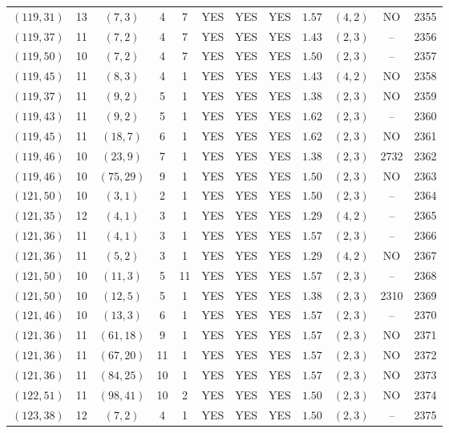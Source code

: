 \begin{longtable}{|c|c|c|c|c|c|c|c|c|c|c|c|}
$(119,31)$ & 13 & $(7,3)$ & 4 & 7 & YES & YES & YES & $1.57$ & $(4,2)$ & NO & 2355\\
$(119,37)$ & 11 & $(7,2)$ & 4 & 7 & YES & YES & YES & $1.43$ & $(2,3)$ & -- & 2356\\
$(119,50)$ & 10 & $(7,2)$ & 4 & 7 & YES & YES & YES & $1.50$ & $(2,3)$ & -- & 2357\\
$(119,45)$ & 11 & $(8,3)$ & 4 & 1 & YES & YES & YES & $1.43$ & $(4,2)$ & NO & 2358\\
$(119,37)$ & 11 & $(9,2)$ & 5 & 1 & YES & YES & YES & $1.38$ & $(2,3)$ & NO & 2359\\
$(119,43)$ & 11 & $(9,2)$ & 5 & 1 & YES & YES & YES & $1.62$ & $(2,3)$ & -- & 2360\\
$(119,45)$ & 11 & $(18,7)$ & 6 & 1 & YES & YES & YES & $1.62$ & $(2,3)$ & NO & 2361\\
$(119,46)$ & 10 & $(23,9)$ & 7 & 1 & YES & YES & YES & $1.38$ & $(2,3)$ & 2732 & 2362\\
$(119,46)$ & 10 & $(75,29)$ & 9 & 1 & YES & YES & YES & $1.50$ & $(2,3)$ & NO & 2363\\
$(121,50)$ & 10 & $(3,1)$ & 2 & 1 & YES & YES & YES & $1.50$ & $(2,3)$ & -- & 2364\\
$(121,35)$ & 12 & $(4,1)$ & 3 & 1 & YES & YES & YES & $1.29$ & $(4,2)$ & -- & 2365\\
$(121,36)$ & 11 & $(4,1)$ & 3 & 1 & YES & YES & YES & $1.57$ & $(2,3)$ & -- & 2366\\
$(121,36)$ & 11 & $(5,2)$ & 3 & 1 & YES & YES & YES & $1.29$ & $(4,2)$ & NO & 2367\\
$(121,50)$ & 10 & $(11,3)$ & 5 & 11 & YES & YES & YES & $1.57$ & $(2,3)$ & -- & 2368\\
$(121,50)$ & 10 & $(12,5)$ & 5 & 1 & YES & YES & YES & $1.38$ & $(2,3)$ & 2310 & 2369\\
$(121,46)$ & 10 & $(13,3)$ & 6 & 1 & YES & YES & YES & $1.57$ & $(2,3)$ & -- & 2370\\
$(121,36)$ & 11 & $(61,18)$ & 9 & 1 & YES & YES & YES & $1.57$ & $(2,3)$ & NO & 2371\\
$(121,36)$ & 11 & $(67,20)$ & 11 & 1 & YES & YES & YES & $1.57$ & $(2,3)$ & NO & 2372\\
$(121,36)$ & 11 & $(84,25)$ & 10 & 1 & YES & YES & YES & $1.57$ & $(2,3)$ & NO & 2373\\
$(122,51)$ & 11 & $(98,41)$ & 10 & 2 & YES & YES & YES & $1.50$ & $(2,3)$ & NO & 2374\\
$(123,38)$ & 12 & $(7,2)$ & 4 & 1 & YES & YES & YES & $1.50$ & $(2,3)$ & -- & 2375\\

\end{longtable}

